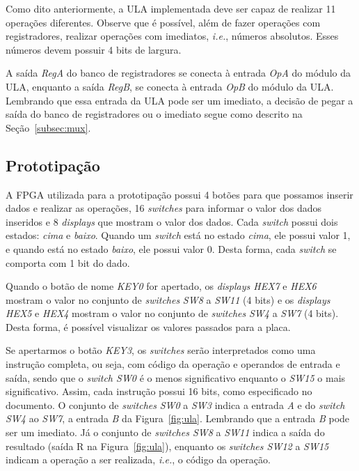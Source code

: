 \documentclass[11pt,a4paper,titlepage]{article}
\begin{document}
Como dito anteriormente, a ULA implementada deve ser capaz de realizar 11 operações diferentes.
Observe que é possível, além de fazer operações com registradores, realizar operações com imediatos, \textit{i.e.}, números absolutos.
Esses números devem possuir 4 bits de largura.

A saída \textit{RegA} do banco de registradores se conecta à entrada \textit{OpA} do módulo da ULA, enquanto a saída \textit{RegB}, se conecta à entrada \textit{OpB} do módulo da ULA.
Lembrando que essa entrada da ULA pode ser um imediato, a decisão de pegar a saída do banco de registradores ou o imediato segue como descrito na Seção~\ref{subsec:mux}.

\subsection{Prototipação}\label{subsec:prot}

A FPGA utilizada para a prototipação possui 4 botões para que possamos inserir dados e realizar as operações, 16 \textit{switches} para informar o valor dos dados inseridos e 8 \textit{displays} que mostram o valor dos dados.
Cada \textit{switch} possui dois estados: \textit{cima} e \textit{baixo}.
Quando um \textit{switch} está no estado \textit{cima}, ele possui valor 1, e quando está no estado \textit{baixo}, ele possui valor 0.
Desta forma, cada \textit{switch} se comporta com 1 bit do dado.

Quando o botão de nome \textit{KEY0} for apertado, os \textit{displays HEX7} e \textit{HEX6} mostram o valor no conjunto de \textit{switches} \textit{SW8} a \textit{SW11} (4 bits) e os \textit{displays HEX5} e \textit{HEX4} mostram o valor no conjunto de \textit{switches} \textit{SW4} a \textit{SW7} (4 bits).
Desta forma, é possível visualizar os valores passados para a placa.

Se apertarmos o botão \textit{KEY3}, os \textit{switches} serão interpretados como uma instrução completa, ou seja, com código da operação e operandos de entrada e saída, sendo que o \textit{switch SW0} é o menos significativo enquanto o \textit{SW15} o mais significativo.
Assim, cada instrução possui 16 bits, como especificado no documento.
O conjunto de \textit{switches} \textit{SW0} a \textit{SW3} indica a entrada \textit{A} e do \textit{switch SW4} ao \textit{SW7}, a entrada \textit{B} da Figura~\ref{fig:ula}.
Lembrando que a entrada \textit{B} pode ser um imediato.
Já o conjunto de \textit{switches SW8} a \textit{SW11} indica a saída do resultado (saída R na Figura~\ref{fig:ula}), enquanto os \textit{switches SW12} a \textit{SW15} indicam a operação a ser realizada, \textit{i.e.}, o código da operação.
\end{document}
